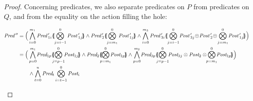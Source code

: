 \documentclass{lmcs}
\newcommand{\shortotimes}{\!\otimes\!}
\begin{document}
\begin{proof}
Concerning predicates, we also separate predicates on $P$ from predicates on $Q$, and from the equality on the action filling the hole:
\begin{footnotesize}
\begin{align*}
\Pred\,''&=\Big(\bigwedge_{i=0}^{m_1}\Pred\,'_{1i}\subst{\bigotimes_{j=i-1}^{0}\Post\,'_{1j}}\land\Pred\,'_2 \subst{\bigotimes_{j=m_1}^{0}\Post\,'_{1j}}\land%
\bigwedge_{i=0}^{m_3}\Pred\,'_{3i}\subst{\bigotimes_{j=i-1}^{0}\!\Post\,'_{3j}\shortotimes\Post\,'_2\shortotimes\bigotimes_{j=m_1}^{0}\!\Post\,'_{1j}}\Big)\\
&=\Big(\bigwedge_{p=0}^{m_1}\!\Pred_{1p}\subst{\!\!\bigotimes_{j=p-1}^{0}\!\!\Post_{1j}}\land\Pred_2\subst{\!\!\bigotimes_{p=m_1}^{0}\!\!\Post_{1p}}\land \bigwedge_{p=0}^{m_2}\!\Pred_{3p}\subst{\!\!\bigotimes_{j=p-1}^{0}\!\!\Post_{3j}\otimes\Post_2 \otimes\!\!\bigotimes_{p=m_1}^{0}\!\!\Post_{1p}}\Big)\\&\qquad
\land \bigwedge_{t=0}^{n} \Pred_t\bigotimes_{i=t-1}^{0}\Post_i%

\end{align*}
\end{footnotesize}
\end{proof}
\end{document}

